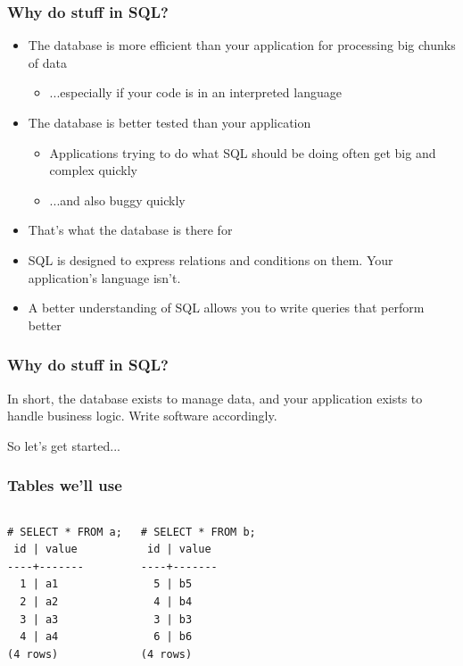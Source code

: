 \documentclass{beamer}
\begin{document}
\begin{frame}
    \frametitle{Why do stuff in SQL?}
    \begin{itemize}
        \item The database is more efficient than your application for processing big chunks of data
        \begin{itemize}
            \item ...especially if your code is in an interpreted language
        \end{itemize}
        \item The database is better tested than your application
        \begin{itemize}
            \item Applications trying to do what SQL should be doing often get big and complex quickly
            \item ...and also buggy quickly 
        \end{itemize}
        \item That's what the database is there for
        \item SQL is designed to express relations and conditions on them. Your application's language isn't.
        \item A better understanding of SQL allows you to write queries that perform better
    \end{itemize}
\end{frame}

\begin{frame}
    \frametitle{Why do stuff in SQL?}
    In short, the database exists to manage data, and your application exists to handle business logic. Write software accordingly.
\end{frame}

\begin{frame}
    So let's get started...
\end{frame}

\begin{frame}[fragile]
    \frametitle{Tables we'll use}

   \begin{columns}[l]
       \column{1.5in}
       \begin{verbatim}
# SELECT * FROM a;
 id | value
----+-------
  1 | a1
  2 | a2
  3 | a3
  4 | a4
(4 rows)
       \end{verbatim}
       \column{1.5in}
       \begin{verbatim}
# SELECT * FROM b;
 id | value
----+-------
  5 | b5
  4 | b4
  3 | b3
  6 | b6
(4 rows)
       \end{verbatim}
   \end{columns}
\end{frame}
\end{document}
